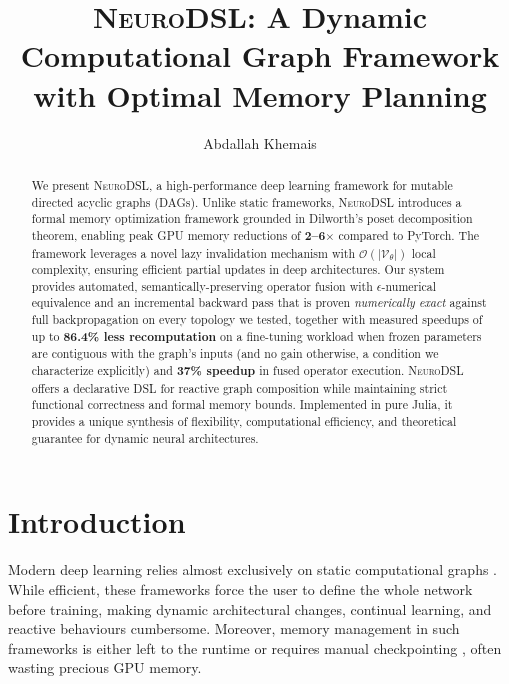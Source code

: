 \documentclass{article}
\title{\textsc{NeuroDSL}: A Dynamic Computational Graph Framework\\ with Optimal Memory Planning}
\author{Abdallah Khemais }
\date{}
\begin{document}
\maketitle

\begin{abstract}
We present \textsc{NeuroDSL}, a high-performance deep learning framework for mutable directed acyclic graphs (DAGs). Unlike static frameworks, \textsc{NeuroDSL} introduces a formal memory optimization framework grounded in Dilworth’s poset decomposition theorem, enabling peak GPU memory reductions of \textbf{2--6$\times$} compared to PyTorch. The framework leverages a novel lazy invalidation mechanism with $\mathcal{O}(|\mathcal{V}_{\theta}|)$ local complexity, ensuring efficient partial updates in deep architectures. Our system provides automated, semantically-preserving operator fusion with $\epsilon$-numerical equivalence and an incremental backward pass that is proven \emph{numerically exact} against full backpropagation on every topology we tested, together with measured speedups of up to \textbf{86.4\% less recomputation} on a fine-tuning workload when frozen parameters are contiguous with the graph's inputs (and no gain otherwise, a condition we characterize explicitly) and \textbf{37\% speedup} in fused operator execution. \textsc{NeuroDSL} offers a declarative DSL for reactive graph composition while maintaining strict functional correctness and formal memory bounds. Implemented in pure Julia, it provides a unique synthesis of flexibility, computational efficiency, and theoretical guarantee for dynamic neural architectures.
\end{abstract}

\section{Introduction}
\label{sec:intro}

Modern deep learning relies almost exclusively on static computational graphs \cite{pytorch, jax, tensorflow}. While efficient, these frameworks force the user to define the whole network before training, making dynamic architectural changes, continual learning, and reactive behaviours cumbersome. Moreover, memory management in such frameworks is either left to the runtime \cite{pytorch} or requires manual checkpointing \cite{jax}, often wasting precious GPU memory.
\end{document}

